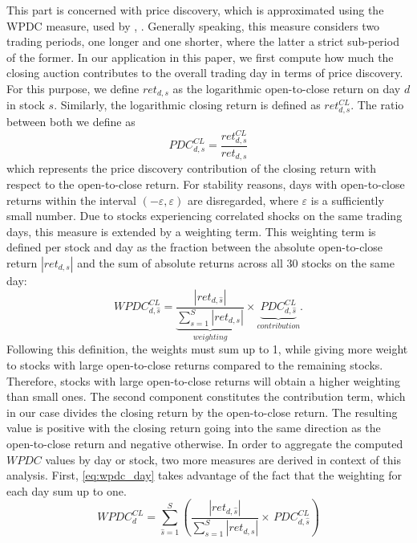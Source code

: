 \documentclass[11pt,a4paper, notitlepage]{article}
\begin{document}
	This part is concerned with price discovery, which is approximated using the \ac{WPDC} measure, used by \textcite{BarclayWarner1993}, \textcite{BarclayHendershott2003}. Generally speaking, this measure considers two trading periods, one longer and one shorter, where the latter a strict sub-period of the former. In our application in this paper, we first compute how much the closing auction contributes to the overall trading day in terms of price discovery. For this purpose, we define $ret_{d,s}$ as the logarithmic open-to-close return on day $d$ in stock $s$. Similarly, the logarithmic closing return is defined as $ret^{CL}_{d,s}$. The ratio between both we define as
	\begin{equation*}
		PDC^{CL}_{d,s} = \frac{ret^{CL}_{d,s}}{ret_{d,s}}
	\end{equation*}
	which represents the price discovery contribution of the closing return with respect to the open-to-close return. For stability reasons, days with open-to-close returns within the interval $(-\varepsilon, \varepsilon)$ are disregarded, where $\varepsilon$ is a sufficiently small number. Due to stocks experiencing correlated shocks on the same trading days, this measure is extended by a weighting term. This weighting term is defined per stock and day as the fraction between the absolute open-to-close return $|ret_{d,s}|$ and the sum of absolute returns across all 30 stocks on the same day:
	\begin{equation}
		\label{eq:wpdc_base}
		WPDC^{CL}_{d,\hat{s}} = \underbrace{\frac{|ret_{d,\hat{s}}|}{\sum_{s=1}^{S} |ret_{d,s}|}}_{weighting}  \times \underbrace{PDC^{CL}_{d,\hat{s}}}_{contribution}.
	\end{equation}
	Following this definition, the weights must sum up to 1, while giving more weight to stocks with large open-to-close returns compared to the remaining stocks. Therefore, stocks with large open-to-close returns will obtain a higher weighting than small ones. The second component constitutes the contribution term, which in our case divides the closing return by the open-to-close return. The resulting value is positive with the closing return going into the same direction as the open-to-close return and negative otherwise. In order to aggregate the computed $WPDC$ values by day or stock, two more measures are derived in context of this analysis. First, \cref{eq:wpdc_day} takes advantage of the fact that the weighting for each day sum up to one.
	\begin{equation}
		\label{eq:wpdc_day}
		WPDC^{CL}_{d} = \sum_{\hat{s}=1}^{S} \left( \frac{|ret_{d,\hat{s}}|}{\sum_{s=1}^{S} |ret_{d,s}|} \times \, PDC^{CL}_{d,\hat{s}} \right)
	\end{equation}
\end{document}
